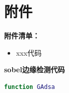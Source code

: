 \documentclass{my_paper}
\begin{document}
\newpage
\begin{center}
\end{center}

\newpage
\section{附件}
\textbf{附件清单：}
\renewcommand\theenumi{\roman{enumi}}
\renewcommand\labelenumi{\textbf{附录\theenumi}}
\begin{itemize}
    \item xxx代码
\end{itemize}

\textbf{sobel边缘检测代码}

\begin{lstlisting}[language=matlab]
    function GAdsa 
\end{lstlisting}
\end{document}
